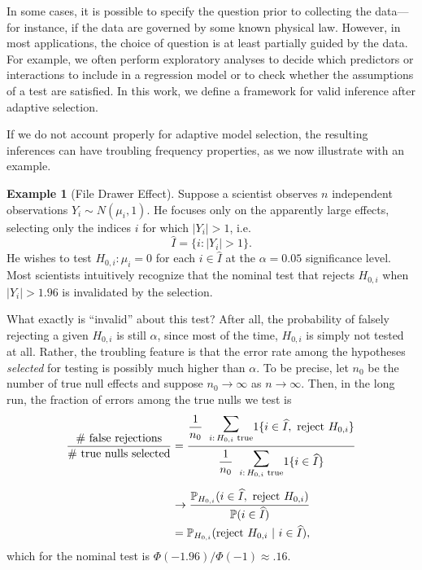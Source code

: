 \documentclass{article}
\theoremstyle{definition}
\newtheorem{example}{Example}
\newcommand{\hI}{\widehat{I}}
\begin{document}
In some cases, it is possible to specify the question prior to collecting the data---for instance, if the data are governed by some known physical law. However, in most applications, the choice of question is at least partially guided by the data. For example, we often perform exploratory analyses to decide which predictors or interactions to include in a regression model or to check whether the assumptions of a test are satisfied. In this work, we define a framework for valid inference after adaptive selection.

If we do not account properly for adaptive model selection, the resulting inferences can have troubling frequency properties, as we now illustrate with an example.

\begin{example}[File Drawer Effect]
\label{ex:file_drawer}
Suppose a scientist observes $n$ independent observations $Y_i \sim N(\mu_i, 1)$. He focuses only on the apparently large effects, selecting only the indices $i$ for which $|Y_i|>1$, i.e.
\[ \hI = \{i : |Y_i| > 1\}. \]
He wishes to test $H_{0,i}: \mu_i = 0$ for each $i \in \hI$ at the $\alpha = 0.05$ significance level. Most scientists intuitively recognize that the nominal test that rejects $H_{0,i}$ when $|Y_i| > 1.96$ is invalidated by the selection.

What exactly is ``invalid'' about this test? After all, the probability of falsely rejecting a given $H_{0,i}$ is still $\alpha$, since most of the time, $H_{0,i}$ is simply not tested at all. Rather, the troubling feature is that the error rate among the hypotheses {\em selected} for testing is possibly much higher than $\alpha$.
To be precise, let $n_0$ be the number of true null effects and suppose $n_0 \to \infty$ as $n\to\infty$. Then, in the long run, the fraction of errors among the true nulls we test is
\begin{align}
\frac{\text{\# false rejections}}{\text{\# true nulls selected}} &= \genfrac{}{}{}{}
{\raisebox{10pt}{$\dfrac{1}{n_0}\;\;\raisebox{3pt}{$\displaystyle\underset{{i:\,H_{0,i}\text{ true}}}\sum$} 1\{ i\in \hI,\ \text{reject $H_{0,i}$} \}$}}
{\raisebox{-7pt}{$\dfrac{1}{n_0}\;\;\raisebox{3pt}{$\displaystyle\underset{{i:\,H_{0,i}\text{ true}}}\sum$} 1\{ i \in \hI \}$}}
\nonumber\\[5pt]
&\to \frac{\P_{H_{0,i}}(i \in \hI,\ \text{reject $H_{0,i}$})}{\P(i \in \hI)} \nonumber\\
&= \P_{H_{0,i}}(\text{reject $H_{0,i}$}\ |\ i \in \hI), \label{eq:selective_type_1_error}
\end{align}
which for the nominal test is $\Phi(-1.96) / \Phi(-1)  \approx .16$.


\end{example}
\end{document}

